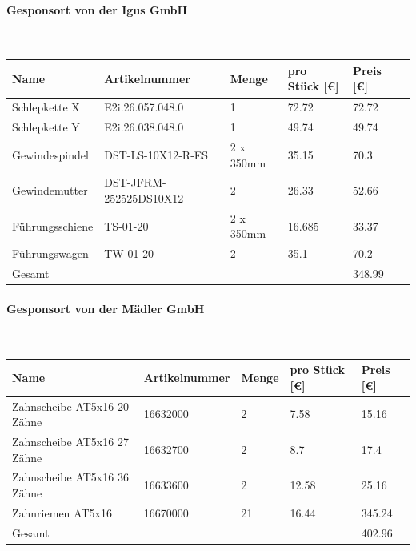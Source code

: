 \paragraph{Gesponsort von der Igus GmbH}\mbox{}\\
\begin{table}[H]
    \begin{tabular}{llllll}
    Name                & Artikelnummer          & Menge & pro Stück {[}€{]} & Preis {[}€{]} \\ \hline
    Schlepkette X       & E2i.26.057.048.0       & 1             & 72.72                   & 72.72         \\
    Schlepkette Y       & E2i.26.038.048.0       & 1             & 49.74                   & 49.74         \\
    Gewindespindel      & DST-LS-10X12-R-ES      & 2 x 350mm              & 35.15                   & 70.3          \\
    Gewindemutter       & DST-JFRM-252525DS10X12 & 2             & 26.33                   & 52.66         \\
    Führungsschiene     & TS-01-20               & 2 x 350mm              & 16.685                  & 33.37         \\
    Führungswagen       & TW-01-20               & 2             & 35.1                    & 70.2          \\ \hline
    Gesamt              &                        &               &                         & 348.99       
    \end{tabular}
\end{table}

\paragraph{Gesponsort von der Mädler GmbH}\mbox{}\\
\begin{table}[H]
    \begin{tabular}{lllll}
    Name                           & Artikelnummer & Menge & pro Stück {[}€{]} & Preis {[}€{]}  \\ \hline
    Zahnscheibe AT5x16 20 Zähne    & 16632000      & 2     & 7.58            & 15.16  \\
    Zahnscheibe AT5x16 27 Zähne & 16632700      & 2     & 8.7             & 17.4   \\
    Zahnscheibe AT5x16 36 Zähne   & 16633600      & 2     & 12.58           & 25.16  \\
    Zahnriemen AT5x16              & 16670000      & 21    & 16.44           & 345.24 \\ \hline
    Gesamt                         &               &       &                 & 402.96
    \end{tabular}
\end{table}

